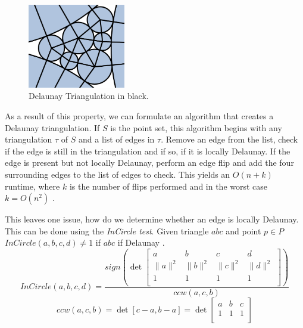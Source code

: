 \documentclass[11pt]{article}
\theoremstyle{definition}
\begin{document}
	\begin{figure}
  		\begin{center}
    		\includegraphics[width=0.38\textwidth]{delaunayemph}
  		\end{center}
  		\caption{Delaunay Triangulation in black.}
	\end{figure}
	As a result of this property, we can formulate an algorithm that creates a Delaunay triangulation. 
	If $S$ is the point set, this algorithm begins with any triangulation $\tau$ of $S$ and a list of edges in $\tau$. 
	Remove an edge from the list, check if the edge is still in the triangulation and if so, if it is locally Delaunay. 
	If the edge is present but not locally Delaunay, perform an edge flip and add the four surrounding edges to the list of edges to check. 
	This yields an $O(n + k)$ runtime, where $k$ is the number of flips performed and in the worst case $k = O(n^2)$ \cite{meshGeneration}.

	This leaves one issue, how do we determine whether an edge is locally Delaunay. 
	This can be done using the \emph{InCircle test}. 
	Given triangle $abc$ and point $p \in P$ $InCircle(a,b,c,d) \neq 1$ if $abc$ if Delaunay \cite{princeton:CCW}. 
	\begin{equation}
		InCircle(a,b,c,d) = \frac{sign(\det
		\begin{bmatrix}
    			a & b & c & d \\
    			\|a\|^2 & \|b\|^2 & \|c\|^2 & \|d\|^2 \\
    			1 & 1 & 1 & 1 \\
		\end{bmatrix} 
		)}{ccw(a,c,b)}
	\end{equation}
	\begin{equation}
		ccw(a,c,b) = \det[c-a,b-a] = \det
		\begin{bmatrix}
    			a & b & c \\
    			1 & 1 & 1\\
		\end{bmatrix} 
	\end{equation} 
	
\end{document}
